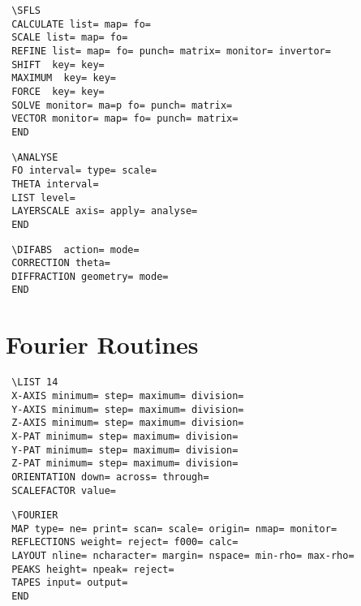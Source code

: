 \documentclass[10pt,a4paper]{report}
\begin{document}
\bigskip{}



\small\begin{verbatim}
 \SFLS
 CALCULATE list= map= fo=
 SCALE list= map= fo=
 REFINE list= map= fo= punch= matrix= monitor= invertor=
 SHIFT  key= key=
 MAXIMUM  key= key=
 FORCE  key= key=
 SOLVE monitor= ma=p fo= punch= matrix=
 VECTOR monitor= map= fo= punch= matrix=
 END
\end{verbatim}\normalsize




\bigskip{}



\small\begin{verbatim}
 \ANALYSE
 FO interval= type= scale=
 THETA interval=
 LIST level=
 LAYERSCALE axis= apply= analyse=
 END
\end{verbatim}\normalsize




\bigskip{}



\small\begin{verbatim}
 \DIFABS  action= mode=
 CORRECTION theta=
 DIFFRACTION geometry= mode=
 END
\end{verbatim}\normalsize


\section{Fourier Routines}


\bigskip{}



\small\begin{verbatim}
 \LIST 14
 X-AXIS minimum= step= maximum= division=
 Y-AXIS minimum= step= maximum= division=
 Z-AXIS minimum= step= maximum= division=
 X-PAT minimum= step= maximum= division=
 Y-PAT minimum= step= maximum= division=
 Z-PAT minimum= step= maximum= division=
 ORIENTATION down= across= through=
 SCALEFACTOR value=
\end{verbatim}\normalsize




\bigskip{}



\small\begin{verbatim}
 \FOURIER
 MAP type= ne= print= scan= scale= origin= nmap= monitor=
 REFLECTIONS weight= reject= f000= calc=
 LAYOUT nline= ncharacter= margin= nspace= min-rho= max-rho=
 PEAKS height= npeak= reject=
 TAPES input= output=
 END
\end{verbatim}\normalsize
\end{document}

